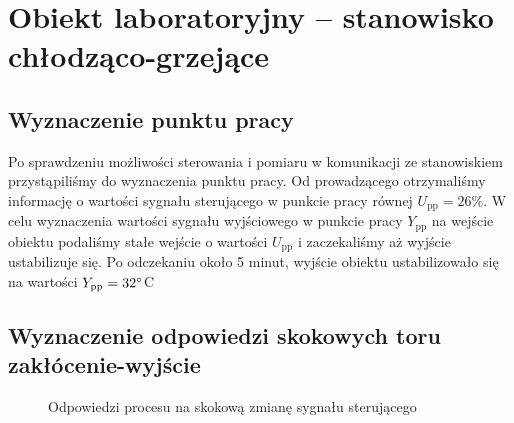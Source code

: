\chapter{Obiekt laboratoryjny -- stanowisko chłodząco-grzejące}
\label{lab1}

\section{Wyznaczenie punktu pracy}
\label{lab1_punkt_pracy}

Po sprawdzeniu możliwości sterowania i pomiaru w komunikacji ze stanowiskiem przystąpiliśmy do wyznaczenia punktu pracy.
Od prowadzącego otrzymaliśmy informację o wartości sygnału sterującego w punkcie pracy 
równej $U_{\mathrm{pp}} = 26\%$. W celu wyznaczenia wartości sygnału wyjściowego w 
punkcie pracy $Y_{\mathrm{pp}}$ na wejście obiektu podaliśmy stałe wejście o wartości 
$U_{\mathrm{pp}}$ i zaczekaliśmy aż wyjście ustabilizuje się. Po odczekaniu około 5 minut,
wyjście obiektu ustabilizowało się na wartości $Y_{\mathrm{pp}} = \num{32} \degree $C


\section{Wyznaczenie odpowiedzi skokowych toru zakłócenie-wyjście}
\label{lab1_odpowiedzi}

\begin{figure}[b]
    \centering
    \caption{Odpowiedzi procesu na skokową zmianę sygnału sterującego}
    \label{lab1_porow_odp_skok_lab}
\end{figure}
\FloatBarrier

